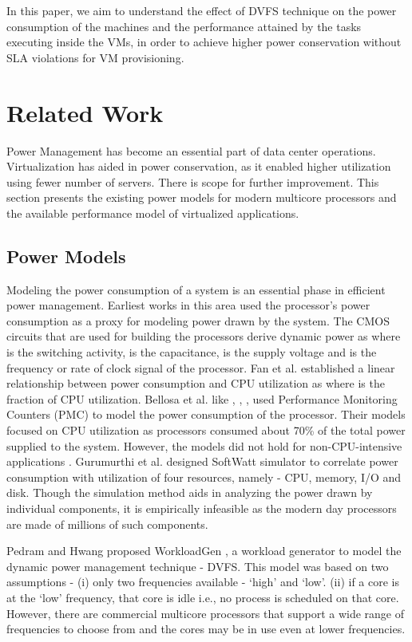 \documentclass{sig-alternate}
\begin{document}
In this paper, we aim to understand the effect of DVFS technique on the power consumption of the machines and the performance attained by the tasks executing inside the VMs, in order to achieve higher power conservation without SLA violations for VM provisioning. 
\section{Related Work}
\label{sec:RWork}
Power Management has become an essential part of data center operations. Virtualization has aided in power conservation, as it enabled higher utilization using fewer number of servers. There is scope for further improvement. This section presents the existing power models for modern multicore processors and the available performance model of virtualized applications.
\subsection{Power Models}
Modeling the power consumption of a system is an essential phase in efficient power management. Earliest works in this area used the processor's power consumption as a proxy for modeling power drawn by the system. The CMOS circuits
that are used for building the processors derive dynamic power as  where  is the switching activity,  is the capacitance,  is the supply voltage and  is the frequency or rate of clock signal of the processor. Fan et al. \cite{Fan02} established a linear relationship between power consumption and CPU utilization as 
where  is the fraction of CPU utilization. Bellosa et al. \cite{Bellosa} like \cite{Isci2003}, \cite{Bertrana}, \cite{Singh2009}, used Performance Monitoring Counters (PMC) to model the power consumption of the processor. Their models focused on CPU utilization as processors consumed about 70\% of the total power supplied to the system. However, the models did not hold for non-CPU-intensive applications \cite{Rivoire2008}. Gurumurthi et al. \cite{Gurumurthi2002} designed SoftWatt simulator to correlate power consumption with utilization of four resources, namely - CPU, memory, I/O and disk. Though the simulation method aids in analyzing the power drawn by individual components, it is empirically infeasible as the modern day processors are made of millions of such components. 

Pedram and Hwang proposed WorkloadGen \cite{Pedram2011}, a workload generator to model the dynamic power management technique - DVFS. This model was based on two assumptions - (i) only two frequencies available - `high' and `low'. (ii) if a core is at the `low' frequency, that core is idle i.e., no process is scheduled on that core. However, there are commercial multicore processors that support a wide range of frequencies to choose from and the cores may be in use even at lower frequencies.
\end{document}

